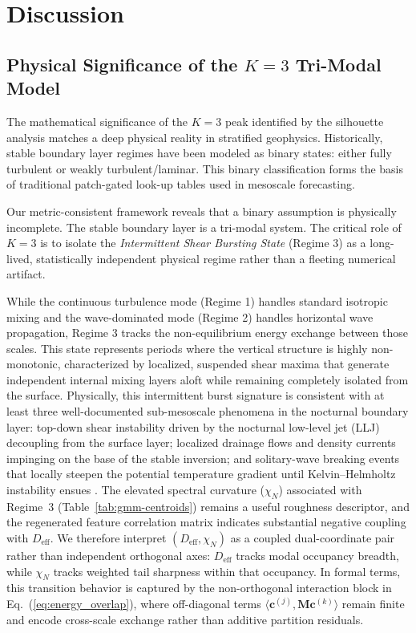 \documentclass[11pt,a4paper]{article}
\begin{document}
 \section{Discussion}
\label{sec:discussion}

\subsection{Physical Significance of the \texorpdfstring{$K=3$}{K3} Tri-Modal Model}

The mathematical significance of the $K=3$ peak identified by the silhouette analysis matches a deep physical reality in stratified geophysics. Historically, stable boundary layer regimes have been modeled as binary states: either fully turbulent or weakly turbulent/laminar. This binary classification forms the basis of traditional patch-gated look-up tables used in mesoscale forecasting.

Our metric-consistent framework reveals that a binary assumption is physically incomplete. The stable boundary layer is a tri-modal system. The critical role of $K=3$ is to isolate the \emph{Intermittent Shear Bursting State} (Regime 3) as a long-lived, statistically independent physical regime rather than a fleeting numerical artifact. 

While the continuous turbulence mode (Regime 1) handles standard isotropic mixing and the wave-dominated mode (Regime 2) handles horizontal wave propagation, Regime 3 tracks the non-equilibrium energy exchange between those scales. This state represents periods where the vertical structure is highly non-monotonic, characterized by localized, suspended shear maxima that generate independent internal mixing layers aloft while remaining completely isolated from the surface. Physically, this intermittent burst signature is consistent with at least three well-documented sub-mesoscale phenomena in the nocturnal boundary layer: top-down shear instability driven by the nocturnal low-level jet (LLJ) decoupling from the surface layer; localized drainage flows and density currents impinging on the base of the stable inversion; and solitary-wave breaking events that locally steepen the potential temperature gradient until Kelvin--Helmholtz instability ensues \citep{Sun2015}. The elevated spectral curvature ($\chi_N$) associated with Regime~3 (Table~\ref{tab:gmm-centroids}) remains a useful roughness descriptor, and the regenerated feature correlation matrix indicates substantial negative coupling with $D_{\mathrm{eff}}$. We therefore interpret $(D_{\mathrm{eff}},\chi_N)$ as a coupled dual-coordinate pair rather than independent orthogonal axes: $D_{\mathrm{eff}}$ tracks modal occupancy breadth, while $\chi_N$ tracks weighted tail sharpness within that occupancy.
In formal terms, this transition behavior is captured by the non-orthogonal interaction block in Eq.~(\ref{eq:energy_overlap}), where off-diagonal terms $\langle \mathbf{c}^{(j)}, \mathbf{M}\mathbf{c}^{(k)} \rangle$ remain finite and encode cross-scale exchange rather than additive partition residuals.
\end{document}
